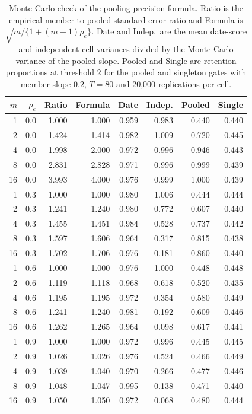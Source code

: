 \documentclass[11pt,a4paper]{article}
\begin{document}
\begin{table}[htbp]\centering\small\setlength{\tabcolsep}{4.5pt}
\caption{Monte Carlo check of the pooling precision formula. Ratio is the
empirical member-to-pooled standard-error ratio and Formula is
$\sqrt{m/\{1+(m-1)\rho_e\}}$. Date and Indep.\ are the mean date-score and
independent-cell variances divided by the Monte Carlo variance of the pooled
slope. Pooled and Single are retention proportions at threshold $2$ for the
pooled and singleton gates with member slope $0.2$, $T=80$ and
20,000 replications per cell.}
\label{tab:precision-check}
\begin{tabular}{rrrrrrrr}\toprule
$m$ & $\rho_e$ & Ratio & Formula & Date & Indep. & Pooled & Single\\\midrule
1 & 0.0 & 1.000 & 1.000 & 0.959 & 0.983 & 0.440 & 0.440 \\
2 & 0.0 & 1.424 & 1.414 & 0.982 & 1.009 & 0.720 & 0.445 \\
4 & 0.0 & 1.998 & 2.000 & 0.972 & 0.996 & 0.946 & 0.443 \\
8 & 0.0 & 2.831 & 2.828 & 0.971 & 0.996 & 0.999 & 0.439 \\
16 & 0.0 & 3.993 & 4.000 & 0.976 & 0.999 & 1.000 & 0.439 \\
1 & 0.3 & 1.000 & 1.000 & 0.980 & 1.006 & 0.444 & 0.444 \\
2 & 0.3 & 1.241 & 1.240 & 0.980 & 0.772 & 0.607 & 0.440 \\
4 & 0.3 & 1.455 & 1.451 & 0.984 & 0.528 & 0.737 & 0.442 \\
8 & 0.3 & 1.597 & 1.606 & 0.964 & 0.317 & 0.815 & 0.438 \\
16 & 0.3 & 1.702 & 1.706 & 0.976 & 0.181 & 0.860 & 0.440 \\
1 & 0.6 & 1.000 & 1.000 & 0.976 & 1.000 & 0.448 & 0.448 \\
2 & 0.6 & 1.119 & 1.118 & 0.968 & 0.618 & 0.520 & 0.435 \\
4 & 0.6 & 1.195 & 1.195 & 0.972 & 0.354 & 0.580 & 0.449 \\
8 & 0.6 & 1.241 & 1.240 & 0.981 & 0.192 & 0.609 & 0.446 \\
16 & 0.6 & 1.262 & 1.265 & 0.964 & 0.098 & 0.617 & 0.441 \\
1 & 0.9 & 1.000 & 1.000 & 0.972 & 0.996 & 0.445 & 0.445 \\
2 & 0.9 & 1.026 & 1.026 & 0.976 & 0.524 & 0.466 & 0.449 \\
4 & 0.9 & 1.039 & 1.040 & 0.970 & 0.266 & 0.477 & 0.446 \\
8 & 0.9 & 1.048 & 1.047 & 0.995 & 0.138 & 0.471 & 0.440 \\
16 & 0.9 & 1.050 & 1.050 & 0.972 & 0.068 & 0.480 & 0.444 \\
\bottomrule\end{tabular}
\end{table}
\end{document}
